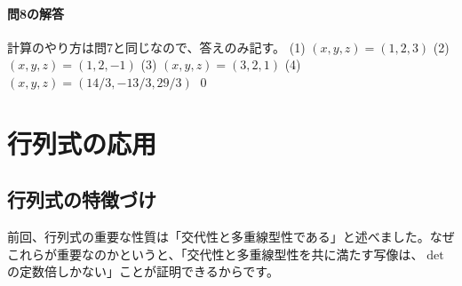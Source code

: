 \paragraph{問8の解答} 計算のやり方は問7と同じなので、答えのみ記す。
(1) $(x, y, z) = (1, 2, 3)$ 
(2) $(x, y, z) = (1, 2, -1)$ 
(3) $(x, y, z) = (3, 2, 1)$ 
(4) $(x, y, z) = (14/3, -13/3, 29/3)$ \qed

\section{行列式の応用}

\subsection{行列式の特徴づけ}

前回、行列式の重要な性質は「交代性と多重線型性である」と述べました。なぜこれらが重要なのかというと、「交代性と多重線型性を共に満たす写像は、$\det$の定数倍しかない」ことが証明できるからです。


